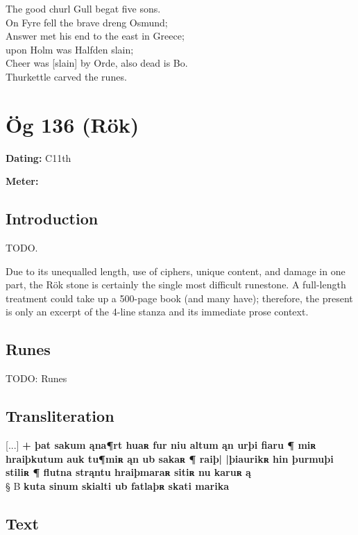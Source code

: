 \bvb The good churl Gull begat five sons. \\
On Fyre fell the brave dreng Osmund; \\
Answer met his end to the east in Greece; \\
upon Holm was Halfden slain; \\
Cheer was [slain] by Orde, also dead is Bo. \\
Thurkettle carved the runes.\evb\evg

\sectionline\clearpage


\section{Ög 136 (Rök)}

\begin{flushright}%
\textbf{Dating:} C11th

\textbf{Meter:} \Fornyrdislag
\end{flushright}%

\subsection{Introduction}

TODO.

Due to its unequalled length, use of ciphers, unique content, and damage in one part, the Rök stone is certainly the single most difficult runestone.  A full-length treatment could take up a 500-page book (and many have); therefore, the present is only an excerpt of the 4-line stanza and its immediate prose context.

\subsection{Runes}

TODO: Runes%

\subsection{Transliteration}

{[...]} \textbf{+ þat sakum ąna¶rt huaʀ fur niu altum ąn urþi fiaru ¶ miʀ hraiþkutum auk tu¶miʀ ąn ub sakaʀ ¶ raiþ| |þiaurikʀ hin þurmuþi stiliʀ ¶ flutna strąntu hraiþmaraʀ sitiʀ nu karuʀ ą} \\
§ B \textbf{kuta sinum skialti ub fatlaþʀ skati marika}

\subsection{Text}

